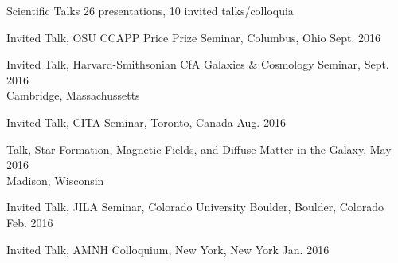\documentclass{resume_clark} %
\begin{document}
\begin{rSection}{Scientific Talks}
26 presentations, 10 invited talks/colloquia 
\begin{etaremune}




\item Invited Talk, OSU CCAPP Price Prize Seminar, Columbus, Ohio \hfill{Sept. 2016}

\item Invited Talk, Harvard-Smithsonian CfA Galaxies \& Cosmology Seminar, \hfill{Sept. 2016}\\
Cambridge, Massachussetts

\item Invited Talk, CITA Seminar, Toronto, Canada \hfill {Aug. 2016}

\item Talk, Star Formation, Magnetic Fields, and Diffuse Matter in the Galaxy, \hfill{May 2016}\\
Madison, Wisconsin 

\item Invited Talk, JILA Seminar, Colorado University Boulder, Boulder, Colorado \hfill {Feb. 2016}

\item Invited Talk, AMNH Colloquium, New York, New York \hfill {Jan. 2016}


\end{etaremune}
\end{rSection}
\end{document}
